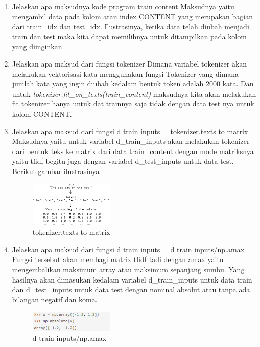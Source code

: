 \begin{enumerate}
        \item Jelaskan apa maksudnya kode program train content 
Maksudnya yaitu mengambil data pada kolom atau index CONTENT yang merupakan bagian dari train\_idx dan test\_idx. Ilustrasinya, ketika data telah diubah menjadi train dan test maka kita dapat memilihnya untuk ditampilkan pada kolom yang diinginkan.

        \item Jelaskan apa maksud dari fungsi tokenizer 
Dimana variabel tokenizer akan melakukan vektorisasi kata menggunakan fungsi Tokenizer yang dimana jumlah kata yang ingin diubah kedalam bentuk token adalah 2000 kata. Dan untuk \emph{tokenizer.fit\_on\_texts(train\_content)} maksudnya kita akan melakukan fit tokenizer hanya untuk dat trainnya saja tidak dengan data test nya untuk kolom CONTENT.

        \item Jelaskan apa maksud dari fungsi d train inputs = tokenizer.texts to matrix
Maksudnya yaitu untuk variabel d\_train\_inputs akan melakukan tokenizer dari bentuk teks ke matrix dari data train\_content dengan mode matriksnya yaitu tfidf begitu juga dengan variabel d\_test\_inputs untuk data test. Berikut gambar ilustrasinya

	\begin{figure}[H]
		\includegraphics[width=4cm]{figures/1174008/7/teori3.PNG}
            	\centering
           	 \caption{tokenizer.texts to matrix}
       	 \end{figure}

        \item Jelaskan apa maksud dari fungsi d train inputs = d train inputs/np.amax
Fungsi tersebut akan membagi matrix tfidf tadi dengan amax yaitu mengembalikan maksimum array atau maksimum sepanjang sumbu. Yang hasilnya akan dimasukan kedalam variabel d\_train\_inputs untuk data train dan d\_test\_inputs untuk data test dengan nominal absolut atau tanpa ada bilangan negatif dan koma.

	\begin{figure}[H]
		\includegraphics[width=4cm]{figures/1174008/7/teori4.PNG}
            	\centering
           	 \caption{d train inputs/np.amax}
       	 \end{figure}


\end{enumerate}

